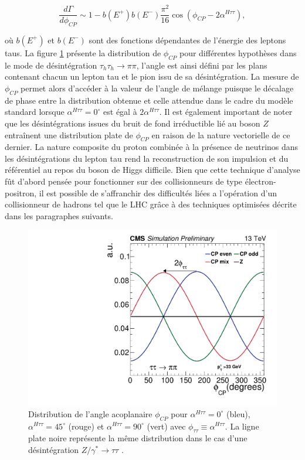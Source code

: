 \begin{equation}
    \frac{d\Gamma}{d\phi_{CP}}\sim 1-b(E^+)b(E^-)\frac{\pi^2}{16}\cos(\phi_{CP}-2\alpha^{H\tau\tau}),
\label{crosssection}
\end{equation}

où $b(E^+)$ et $b(E^-)$ sont des fonctions dépendantes de l'énergie des leptons taus. La figure \ref{phiCP2} présente la distribution de $\phi_{CP}$ pour différentes hypothèses dans le mode de désintégration $\tau_h\tau_h\rightarrow\pi\pi$, l'angle est ainsi défini par les plans contenant chacun un lepton tau et le pion issu de sa désintégration. La mesure de $\phi_{CP}$ permet alors d'accéder à la valeur de l'angle de mélange puisque le décalage de phase entre la distribution obtenue et celle attendue dans le cadre du modèle standard lorsque $\alpha^{H\tau\tau}=0^{\circ}$ est égal à $2\alpha^{H\tau\tau}$. Il est également important de noter que les désintégrations issues du bruit de fond irréductible lié au boson $Z$ entraînent une distribution plate de $\phi_{CP}$ en raison de la nature vectorielle de ce dernier. La nature composite du proton combinée à la présence de neutrinos dans les désintégrations du lepton tau rend la reconstruction de son impulsion et du référentiel au repos du boson de Higgs difficile. Bien que cette technique d'analyse fût d'abord pensée pour fonctionner sur des collisionneurs de type électron-positron, il est possible de s'affranchir des difficultés liées a l'opération d'un collisionneur de hadrons tel que le LHC grâce à des techniques optimisées décrite dans les paragraphes suivants.\\

\begin{figure}
\centering
    \includegraphics[scale=0.5]{Chapitre6/Images/Figure_001.pdf} 
    \caption{Distribution de l'angle acoplanaire $\phi_{CP}$ pour $\alpha^{H\tau\tau}=0^{\circ}$ (bleu), $\alpha^{H\tau\tau}=45^{\circ}$ (rouge) et $\alpha^{H\tau\tau}=90^{\circ}$ (vert) avec $\phi_{\tau\tau}\equiv\alpha^{H\tau\tau}$. La ligne plate noire représente la même distribution dans le cas d'une désintégration $Z/\gamma^*\rightarrow\tau\tau$ \cite{Htautau}.}
    \label{phiCP2}
\end{figure}


